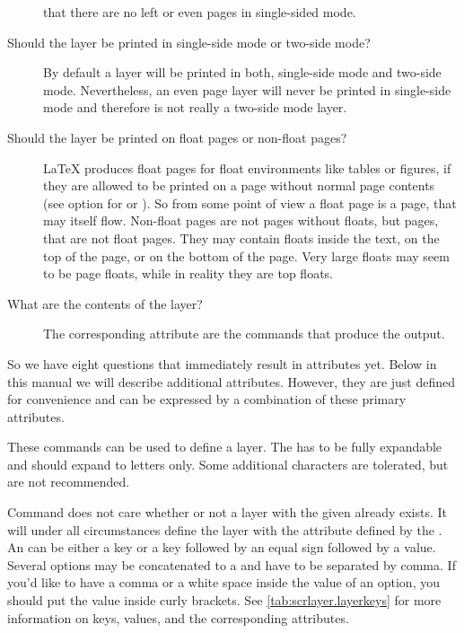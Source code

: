 \begin{description}
  that there are no left or even pages in single-sided mode.
\item[Should the layer be printed in single-side mode or two-side
  mode?\textnote{single-side or two-side}]%
  By default a layer will be printed in both, single-side mode and two-side
  mode. Nevertheless, an even page layer will never be printed in single-side
  mode and therefore is not really a two-side mode layer.
\item[Should the layer be printed on float pages or non-float
  pages?\textnote{float page or non-float page}]%
  \LaTeX{} produces float pages for float environments like tables or figures,
  if they are allowed to be printed on a page without normal page contents
  (see option  for  or ). So
  from some point of view a float page is a page, that may itself
  flow. Non-float pages are not pages without floats, but pages, that are not
  float pages. They may contain floats inside the text, on the top of the
  page, or on the bottom of the page. Very large floats may seem to be page
  floats, while in reality they are top floats.
\item[What are the contents of the layer?\textnote{contents}]%
  The corresponding attribute are the commands that produce the output.
\end{description}
So we have eight questions that immediately result in attributes yet. Below in
this manual we will describe additional attributes. However, they are just
defined for convenience and can be expressed by a combination of these primary
attributes.


\begin{Declaration}
\end{Declaration}
These commands can be used to define a layer. The  has to be
fully expandable and should expand to letters only. Some additional characters
are tolerated, but are not recommended.

Command  does not care whether or not a layer with the
given  already exists. It will under all circumstances
define the layer with the attribute defined by the .  An
 can be either a key or a key followed by an equal sign followed
by a value. Several options may be concatenated to a  and
have to be separated by comma. If you'd like to have a comma or a white space
inside the value of an option, you should put the value inside curly
brackets. See \autoref{tab:scrlayer.layerkeys} for more information on keys,
values, and the corresponding attributes.

